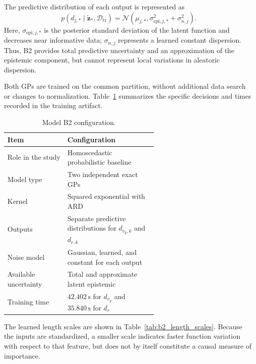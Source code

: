 \documentclass[12pt,a4paper]{report}
\begin{document}
The predictive distribution of each output is represented as
\begin{equation}
    p(d_{j,*}\mid\tilde{\mathbf{z}}_*,\mathcal{D}_{\mathrm{tr}})
    =
    \mathcal{N}\!\left(
        \mu_{j,*},
        \sigma_{\mathrm{epi},j,*}^{2}+\sigma_{n,j}^{2}
    \right).
    \label{eq:b2_predictive_distribution}
\end{equation}
Here, $\sigma_{\mathrm{epi},j,*}$ is the posterior standard deviation of the latent function and decreases near informative data; $\sigma_{n,j}$ represents a learned constant dispersion. Thus, B2 provides total predictive uncertainty and an approximation of the epistemic component, but cannot represent local variations in aleatoric dispersion.

Both GPs are trained on the common partition, without additional data search or changes to normalization. Table~\ref{tab:b2_configuration} summarizes the specific decisions and times recorded in the training artifact.

\begin{table}[htbp]
    \centering
    \caption{Model B2 configuration.}
    \label{tab:b2_configuration}
    \begin{tabular}{@{}lp{0.60\linewidth}@{}}
        \toprule
        Item & Configuration \\
        \midrule
        Role in the study
            & Homoscedastic probabilistic baseline \\
        Model type
            & Two independent exact GPs \\
        Kernel
            & Squared exponential with ARD \\
        Outputs
            & Separate predictive distributions for $d_{v_y,k}$ and $d_{r,k}$ \\
        Noise model
            & Gaussian, learned, and constant for each output \\
        Available uncertainty
            & Total and approximate latent epistemic \\
        Training time
            & $42.402\,\mathrm{s}$ for $d_{v_y}$ and $35.840\,\mathrm{s}$ for $d_r$ \\
        \bottomrule
    \end{tabular}
\end{table}

The learned length scales are shown in Table~\ref{tab:b2_length_scales}. Because the inputs are standardized, a smaller scale indicates faster function variation with respect to that feature, but does not by itself constitute a causal measure of importance.
\end{document}
